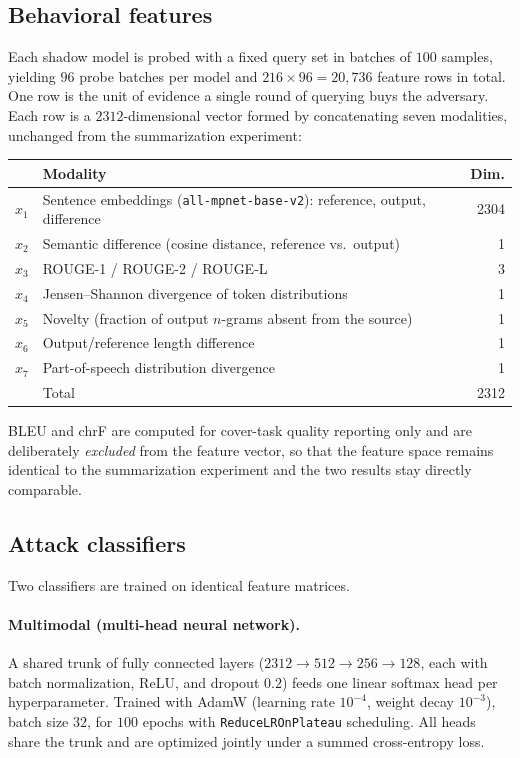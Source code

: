 \documentclass[11pt]{article}
\begin{document}
\subsection{Behavioral features}
\label{sec:features}

Each shadow model is probed with a fixed query set in batches of $100$ samples, yielding
$96$ probe batches per model and $216 \times 96 = 20{,}736$ feature rows in total. One row
is the unit of evidence a single round of querying buys the adversary. Each row is a
$2312$-dimensional vector formed by concatenating seven modalities, unchanged from the
summarization experiment:

\begin{center}
\begin{tabular}{llr}
\toprule
& Modality & Dim. \\
\midrule
$x_1$ & Sentence embeddings (\texttt{all-mpnet-base-v2}): reference, output, difference & 2304 \\
$x_2$ & Semantic difference (cosine distance, reference vs.\ output) & 1 \\
$x_3$ & ROUGE-1 / ROUGE-2 / ROUGE-L & 3 \\
$x_4$ & Jensen--Shannon divergence of token distributions & 1 \\
$x_5$ & Novelty (fraction of output $n$-grams absent from the source) & 1 \\
$x_6$ & Output/reference length difference & 1 \\
$x_7$ & Part-of-speech distribution divergence & 1 \\
\midrule
& Total & 2312 \\
\bottomrule
\end{tabular}
\end{center}

BLEU and chrF are computed for cover-task quality reporting only and are deliberately
\emph{excluded} from the feature vector, so that the feature space remains identical to
the summarization experiment and the two results stay directly comparable.

\subsection{Attack classifiers}

Two classifiers are trained on identical feature matrices.

\paragraph{Multimodal (multi-head neural network).} A shared trunk of fully connected
layers ($2312 \rightarrow 512 \rightarrow 256 \rightarrow 128$, each with batch
normalization, ReLU, and dropout $0.2$) feeds one linear softmax head per hyperparameter.
Trained with AdamW (learning rate $10^{-4}$, weight decay $10^{-3}$), batch size $32$, for
$100$ epochs with \texttt{ReduceLROnPlateau} scheduling. All heads share the trunk and are
optimized jointly under a summed cross-entropy loss.
\end{document}
